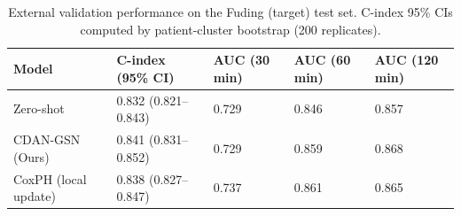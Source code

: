 \begin{table}
\caption{External validation performance on the Fuding (target) test set. C-index 95\% CIs computed by patient-cluster bootstrap (200 replicates).}
\label{tab:performance}
\begin{tabular}{lllll}
\toprule
Model & C-index (95\% CI) & AUC (30 min) & AUC (60 min) & AUC (120 min) \\
\midrule
Zero-shot & 0.832 (0.821–0.843) & 0.729 & 0.846 & 0.857 \\
CDAN-GSN (Ours) & 0.841 (0.831–0.852) & 0.729 & 0.859 & 0.868 \\
CoxPH (local update) & 0.838 (0.827–0.847) & 0.737 & 0.861 & 0.865 \\
\bottomrule
\end{tabular}
\end{table}
